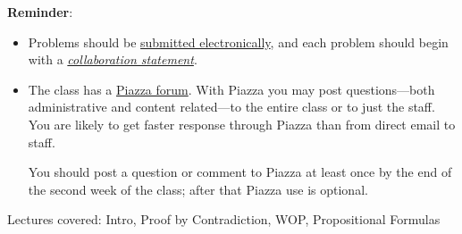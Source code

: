 \documentclass[handout]{mcs}
\begin{document}
\renewcommand{\reading}{
\begin{itemize}
\item Chapter~\bref{proofs_chap}{.\ \emph{What is a Proof?}},

\item  Chapter~\bref{well_ordering_chap}{.\ \emph{The Well Ordering
      Principle}} through~\bref{factor_sec}{;}
  (omit~\bref{well_ordering_sec}{.\ \emph{Well Ordered Sets}}),

\item  Chapter~\bref{logicform_chap}{.\ \emph{Logical Formulas}}
  through~\bref{SAT_sec}{.\ \emph{The SAT Problem}}.

\end{itemize}
These assigned readings do \textbf{not}
  include the Problem sections.  (Many of the problems in the text
  will appear as class or homework problems.)}


\medskip

\textbf{Reminder}:

\begin{itemize}

\item Problems should be
  \href{https://stellar.mit.edu/S/course/6/sp16/6.042/homework/index.html}
       {submitted electronically}, and each problem should begin with a
\href{http://courses.csail.mit.edu/6.042/spring16/pset_instructions.shtml#collab-state}
{\emph{collaboration statement}}.

\item The class has a
  \href{http://piazza.com/mit/spring2016/6042j18062j/home} {Piazza
    forum}.  With Piazza you may post questions---both administrative
  and content related---to the entire class or to just the staff.  You
  are likely to get faster response through Piazza than from direct
  email to staff.

  You should post a question or comment to Piazza at least once by the
  end of the second week of the class; after that Piazza use is
  optional.
\end{itemize}

\begin{staffnotes}
Lectures covered: Intro, Proof by Contradiction, WOP, Propositional Formulas
\end{staffnotes}


\end{document}
